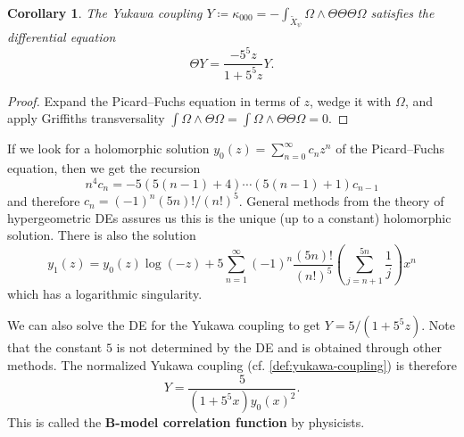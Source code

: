 \documentclass{report}
\theoremstyle{plain}
\newtheorem{corollary}[theorem]{Corollary}
\theoremstyle{definition}
\theoremstyle{remark}
\begin{document}
\begin{corollary}
  The Yukawa coupling $Y \coloneqq \kappa_{000} =
  -\int_{\tilde{X}_\psi} \Omega \wedge \Theta \Theta \Theta \Omega$
  satisfies the differential equation
  \[ \Theta Y = \frac{-5^5 z}{1 + 5^5z} Y. \]
\end{corollary}

\begin{proof}
  Expand the Picard--Fuchs equation in terms of $z$, wedge it with
  $\Omega$, and apply Griffiths transversality $\int \Omega \wedge
  \Theta \Omega = \int \Omega \wedge \Theta\Theta\Omega = 0$.
\end{proof}

If we look for a holomorphic solution $y_0(z) = \sum_{n=0}^\infty c_n
z^n$ of the Picard--Fuchs equation, then we get the recursion
\[ n^4 c_n = -5(5(n-1)+4) \cdots (5(n-1)+1) c_{n-1} \]
and therefore $c_n = (-1)^n(5n)!/(n!)^5$. General methods from the
theory of hypergeometric DEs assures us this is the unique (up to a
constant) holomorphic solution. There is also the solution
\[ y_1(z) = y_0(z) \log(-z) + 5 \sum_{n=1}^\infty (-1)^n\frac{(5n)!}{(n!)^5} \left(\sum_{j=n+1}^{5n} \frac{1}{j}\right) x^n \]
which has a logarithmic singularity.

We can also solve the DE for the Yukawa coupling to get $Y = 5/(1 +
5^5z)$. Note that the constant $5$ is not determined by the DE and is
obtained through other methods. The normalized Yukawa coupling (cf.
\ref{def:yukawa-coupling}) is therefore
\begin{equation} \label{eq:quintic-threefold-normalized-yukawa-coupling}
  Y = \frac{5}{(1 + 5^5x) y_0(x)^2}.
\end{equation}
This is called the {\bf B-model correlation function} by physicists.
\end{document}
